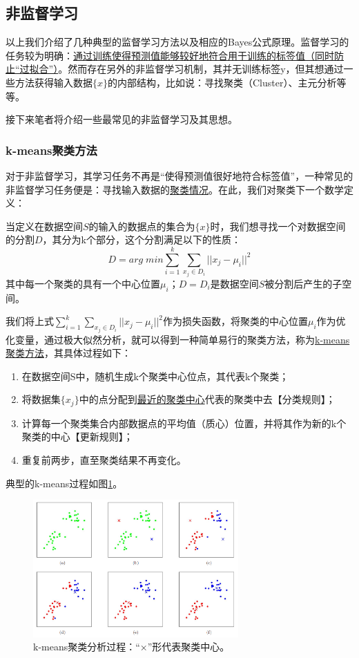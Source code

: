 \subsection{非监督学习}
以上我们介绍了几种典型的监督学习方法以及相应的Bayes公式原理。监督学习的任务较为明确：\uline{通过训练使得预测值能够较好地符合用于训练的标签值（同时防止“过拟合”）}。然而存在另外的非监督学习机制，其并无训练标签y，但其想通过一些方法获得输入数据$\{x\}$的内部结构，比如说：寻找聚类（Cluster）、主元分析等等。

接下来笔者将介绍一些最常见的非监督学习及其思想。

\subsubsection{k-means聚类方法}

对于非监督学习，其学习任务不再是“使得预测值很好地符合标签值”，一种常见的非监督学习任务便是：寻找输入数据的\uline{聚类情况}。在此，我们对聚类下一个数学定义：

当定义在数据空间$S$的输入的数据点的集合为$\{x\}$时，我们想寻找一个对数据空间的分割$D$，其分为k个部分，这个分割满足以下的性质：
\begin{equation}
D = arg\;min \sum^k_{i=1} \sum_{x_j\in D_i} ||x_j - \mu_i||^2
\end{equation}
其中每一个聚类的具有一个中心位置$\mu_i$；$D = {D_i}$是数据空间$S$被分割后产生的子空间。

我们将上式$\sum^k_{i=1} \sum_{x_j\in D_i} ||x_j - \mu_i||^2$作为损失函数，将聚类的中心位置$\mu_i$作为优化变量，通过极大似然分析，就可以得到一种简单易行的聚类方法，称为\uline{k-means聚类方法}，其具体过程如下：
\begin{enumerate}
\item 在数据空间S中，随机生成k个聚类中心位点，其代表k个聚类；
\item 将数据集$\{x_j\}$中的点分配到\uline{最近的聚类中心}代表的聚类中去【分类规则】；
\item 计算每一个聚类集合内部数据点的平均值（质心）位置，并将其作为新的k个聚类的中心【更新规则】；
\item 重复前两步，直至聚类结果不再变化。
\end{enumerate}

典型的k-means过程如图\ref{fig:kmeans}。

\begin{figure}[htbp]
   \centering
   \includegraphics[width=0.7\textwidth]{kMeansClustering.png} %
   \caption{k-means聚类分析过程：“×”形代表聚类中心。}
   \label{fig:kmeans}
\end{figure}

